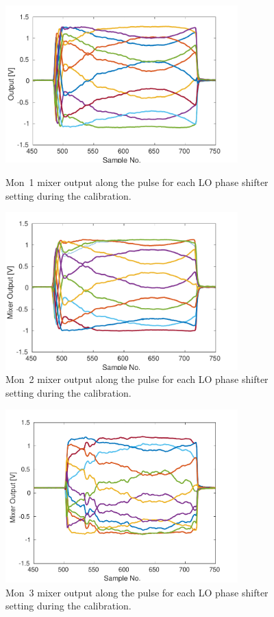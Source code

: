 \begin{figure}
  \centering
  \includegraphics[width=0.8\textwidth]{Figures/phaseMons/mon1AllPoints}
  \caption{Mon~1 mixer output along the pulse for each LO phase shifter setting during the calibration.}
  \label{f:mon1AllPoints}
 \includegraphics[width=0.8\textwidth]{Figures/phaseMons/mon2AllPoints}
  \caption{Mon~2 mixer output along the pulse for each LO phase shifter setting during the calibration.}
  \label{f:mon2AllPoints}
\end{figure}

\begin{figure}
  \centering
  \includegraphics[width=0.8\textwidth]{Figures/phaseMons/mon3AllPoints}
  \caption{Mon~3 mixer output along the pulse for each LO phase shifter setting during the calibration.}
  \label{f:mon3AllPoints}
\end{figure}

